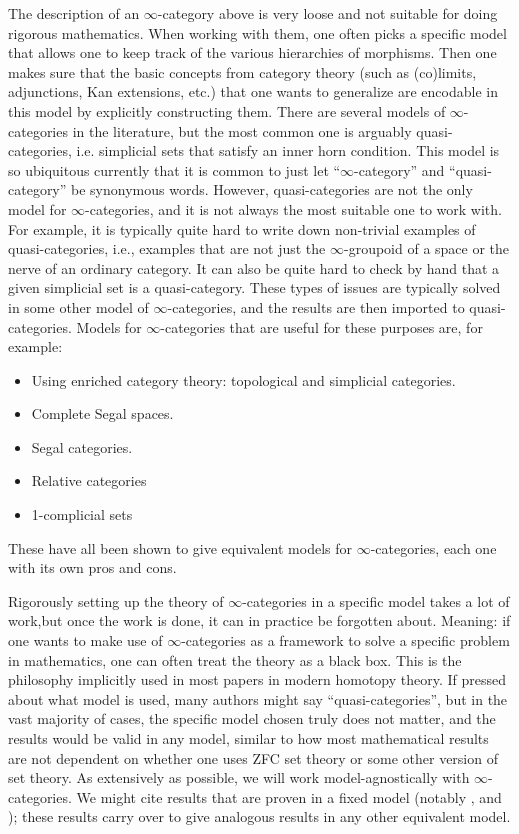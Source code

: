 \documentclass[10pt]{amsart}
\numberwithin{equation}{section}
\theoremstyle{definition}
\begin{document}
	The description of an $\infty$-category above is very loose and not suitable for doing rigorous mathematics.
	When working with them, one often picks a specific model that allows one to keep track of the various hierarchies of morphisms.
	Then one makes sure that the basic concepts from category theory (such as (co)limits, adjunctions, Kan extensions, etc.) that one wants to generalize are encodable in this model by explicitly constructing them.
	There are several models of $\infty$-categories in the literature, but the most common one is arguably quasi-categories, i.e. simplicial sets that satisfy an inner horn condition.
	This model is so ubiquitous currently that it is common to just let ``$\infty$-category'' and ``quasi-category'' be synonymous words.
	However, quasi-categories are not the only model for $\infty$-categories, and it is not always the most suitable one to work with.
	For example, it is typically quite hard to write down non-trivial examples of quasi-categories, i.e., examples that are not just the $\infty$-groupoid of a space or the nerve of an ordinary category.
	It can also be quite hard to check by hand that a given simplicial set is a quasi-category.
	These types of issues are typically solved in some other model of $\infty$-categories, and the results are then imported to quasi-categories.
	Models for $\infty$-categories that are useful for these purposes are, for example:
	\begin{itemize}
		\item Using enriched category theory: topological and simplicial categories.
		\item Complete Segal spaces.
		\item Segal categories.
		\item Relative categories
		\item 1-complicial sets
	\end{itemize}
	These have all been shown to give equivalent models for $\infty$-categories, each one with its own pros and cons.

	Rigorously setting up the theory of $\infty$-categories in a specific model takes a lot of work,but once the work is done, it can in practice be forgotten about.
	Meaning: if one wants to make use of $\infty$-categories as a framework to solve a specific problem in mathematics, one can often treat the theory as a black box.
	This is the philosophy implicitly used in most papers in modern homotopy theory.
	If pressed about what model is used, many authors might say ``quasi-categories'', but in the vast majority of cases, the specific model chosen truly does not matter, and the results would be valid in any model, similar to how most mathematical results are not dependent on whether one uses ZFC set theory or some other version of set theory.
	As extensively as possible, we will work model-agnostically with $\infty$-categories. We might cite results that are proven in a fixed model (notably \cite{HTT}, \cite{HA} and \cite{GH}); these results carry over to give analogous results in any other equivalent model.
\end{document}
